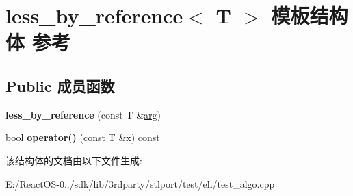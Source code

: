 \hypertarget{structless__by__reference}{}\section{less\+\_\+by\+\_\+reference$<$ T $>$ 模板结构体 参考}
\label{structless__by__reference}
\subsection*{Public 成员函数}
\begin{DoxyCompactItemize}
\item 
\mbox{\label{structless__by__reference_a8b5845d0f88c05a5ee53b8a59eca3cde}} 
{\bfseries less\+\_\+by\+\_\+reference} (const T \&\hyperlink{interfacevoid}{arg})
\item 
\mbox{\label{structless__by__reference_aff0ea361dffa5cf67de34a6fb9507f25}} 
bool {\bfseries operator()} (const T \&x) const
\end{DoxyCompactItemize}


该结构体的文档由以下文件生成\+:\begin{DoxyCompactItemize}
\item 
E\+:/\+React\+O\+S-\/0../sdk/lib/3rdparty/stlport/test/eh/test\+\_\+algo.\+cpp\end{DoxyCompactItemize}
